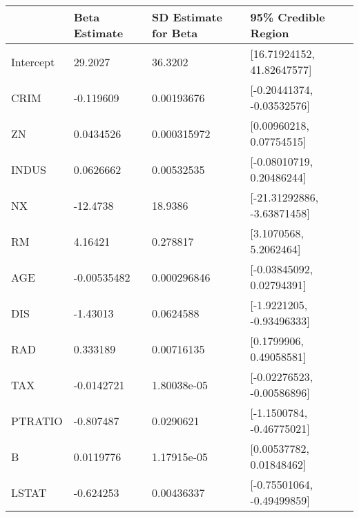 \begin{tabular}{llll}
\hline
           & Beta Estimate   & SD Estimate for Beta   & 95\% Credible Region         \\
\hline
 Intercept & 29.2027         & 36.3202                & [16.71924152, 41.82647577]  \\
 CRIM      & -0.119609       & 0.00193676             & [-0.20441374, -0.03532576]  \\
 ZN        & 0.0434526       & 0.000315972            & [0.00960218, 0.07754515]    \\
 INDUS     & 0.0626662       & 0.00532535             & [-0.08010719, 0.20486244]   \\
 NX        & -12.4738        & 18.9386                & [-21.31292886, -3.63871458] \\
 RM        & 4.16421         & 0.278817               & [3.1070568, 5.2062464]      \\
 AGE       & -0.00535482     & 0.000296846            & [-0.03845092, 0.02794391]   \\
 DIS       & -1.43013        & 0.0624588              & [-1.9221205, -0.93496333]   \\
 RAD       & 0.333189        & 0.00716135             & [0.1799906, 0.49058581]     \\
 TAX       & -0.0142721      & 1.80038e-05            & [-0.02276523, -0.00586896]  \\
 PTRATIO   & -0.807487       & 0.0290621              & [-1.1500784, -0.46775021]   \\
 B         & 0.0119776       & 1.17915e-05            & [0.00537782, 0.01848462]    \\
 LSTAT     & -0.624253       & 0.00436337             & [-0.75501064, -0.49499859]  \\
\hline
\end{tabular}